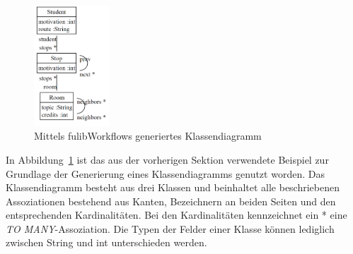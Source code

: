 \begin{figure}[h]
    \centering
    \includegraphics[width=0.25\textwidth]{images/3.1.4/class_diagram}
    \caption{Mittels fulibWorkflows generiertes Klassendiagramm}
    \label{fig:generated-class}
\end{figure}

In Abbildung~\ref{fig:generated-class} ist das aus der vorherigen Sektion verwendete Beispiel zur Grundlage der Generierung eines Klassendiagramms genutzt worden.
Das Klassendiagramm besteht aus drei Klassen und beinhaltet alle beschriebenen Assoziationen bestehend aus Kanten, Bezeichnern an beiden Seiten und den entsprechenden
Kardinalitäten.
Bei den Kardinalitäten kennzeichnet ein * eine \textit{TO MANY}-Assoziation.
Die Typen der Felder einer Klasse können lediglich zwischen String und int unterschieden werden.
